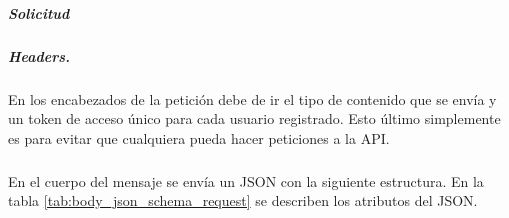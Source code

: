 \subparagraph{Solicitud}
\label{\detokenize{chapter_two/desc_cloudnao:peticion}}

\subparagraph{Headers.}
\label{\detokenize{chapter_two/desc_cloudnao:headers}}
En los encabezados de la petición debe de ir el tipo de contenido que se envía
y un token de acceso único para cada usuario registrado. Esto último
simplemente es para evitar que cualquiera pueda hacer peticiones a la API.

\begin{sphinxVerbatim}[commandchars=\\\{\}]
 
 
\end{sphinxVerbatim}


\subparagraph{}
\label{\detokenize{chapter_two/desc_cloudnao:body}}
En el cuerpo del mensaje se envía un JSON con la siguiente estructura. En la tabla 
\ref{tab:body_json_schema_request} se describen los atributos del JSON.

\begin{sphinxVerbatim}[commandchars=\\\{\}]
   
   
   \PYG{p}{[}
       
       
  \PYG{p}{]}
\end{sphinxVerbatim}


